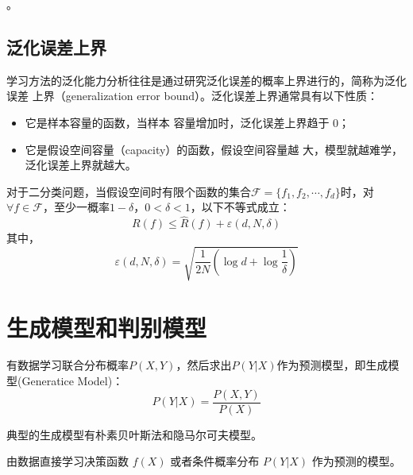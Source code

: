 。
\subsection{泛化误差上界}
学习方法的泛化能力分析往往是通过研究泛化误差的概率上界进行的，简称为泛化误差
上界（generalization error bound）。泛化误差上界通常具有以下性质：
\begin{itemize}
    \item 它是样本容量的函数，当样本
          容量增加时，泛化误差上界趋于 0；
    \item 它是假设空间容量（capacity）的函数，假设空间容量越
          大，模型就越难学，泛化误差上界就越大。
\end{itemize}

\begin{theorem}[泛化误差上界]
    对于二分类问题，当假设空间时有限个函数的集合$\mathcal{F}=\{f_1, f_2, \cdots, f_d\}$时，对$\forall f\in \mathcal{F}$，至少一概率$1-\delta$，$0<\delta<1$，以下不等式成立：
    \begin{equation}
        R(f)\leq\hat{R}(f)+\varepsilon(d,N,\delta)
    \end{equation}
    其中，
    \begin{equation}
        \varepsilon(d,N,\delta)=\sqrt{\frac{1}{2N}(\log d+\log \frac{1}{\delta})}
    \end{equation}
\end{theorem}

\section{生成模型和判别模型}
\begin{definition}[生成模型]
    有数据学习联合分布概率$P(X, Y)$，然后求出$P(Y|X)$作为预测模型，即生成模型(Generatice Model)：
    \begin{equation}
        P(Y|X)=\frac{P(X, Y)}{P(X)}
    \end{equation}

    典型的生成模型有朴素贝叶斯法和隐马尔可夫模型。
\end{definition}

\begin{definition}[判别方法]
    由数据直接学习决策函数 $f(X)$ 或者条件概率分布 $P(Y|X)$ 作为预测的模型。
\end{definition}

